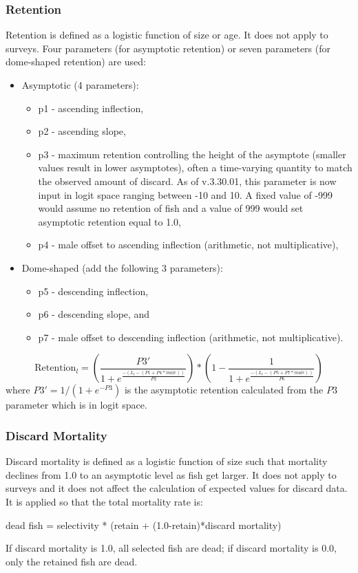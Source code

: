 \subsubsection{Retention}
Retention is defined as a logistic function of size or age. It does not apply to surveys. Four parameters (for asymptotic retention) or seven parameters (for dome-shaped retention) are used:
\begin{itemize}
	\item Asymptotic (4 parameters):
	\begin{itemize}
		\item p1 - ascending inflection,
		\item p2 - ascending slope,
		\item p3 - maximum retention controlling the height of the asymptote (smaller values result in lower asymptotes), often a time-varying quantity to match the observed amount of discard. As of v.3.30.01, this parameter is now input in logit space ranging between -10 and 10. A fixed value of -999 would assume no retention of fish and a value of 999 would set asymptotic retention equal to 1.0,
		\item p4 - male offset to ascending inflection (arithmetic, not multiplicative),
	\end{itemize}
	\item Dome-shaped (add the following 3 parameters):
	\begin{itemize}
		\item p5 - descending inflection,
		\item p6 - descending slope, and
		\item p7 - male offset to descending inflection (arithmetic, not multiplicative).
	\end{itemize}
\end{itemize}

\begin{equation}
	\text{Retention}_l = \left(\frac{P3'}{1 + e^{\frac{-(L_l-(P1+P4*male))}{P2}}}\right)*\left(1 - \frac{1}{1 + e^{\frac{-(L_l-(P5+P7*male))}{P6}}}\right)
\end{equation}
where $P3' = 1/(1+e^{-P3})$ is the asymptotic retention calculated from the $P3$ parameter which is in logit space.

\subsubsection{Discard Mortality}
Discard mortality is defined as a logistic function of size such that mortality declines from 1.0 to an asymptotic level as fish get larger. It does not apply to surveys and it does not affect the calculation of expected values for discard data. It is applied so that the total mortality rate is:
\begin{center}
	dead fish = selectivity * (retain + (1.0-retain)*discard mortality)
\end{center}
If discard mortality is 1.0, all selected fish are dead; if discard mortality is 0.0, only the retained fish are dead.

